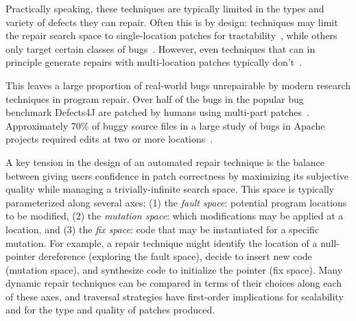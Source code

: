 \documentclass[sigconf, timestamp-false, anonymous=true]{acmart}
\begin{document}
Practically speaking, these techniques are typically limited in the types and
variety of defects they can repair. Often this is by design: techniques may
limit the repair search space to single-location patches for
tractability~\cite{rsrepair,ae,hdrepair}, while others only target certain
classes of bugs~\cite{Xuan17,sapfix,DeMarco14,par}. However, even techniques
that can in principle generate repairs with multi-location patches typically
don't~\cite{patch-correctness}.

This leaves a large proportion of real-world bugs unrepairable by modern
research techniques in program repair.  Over half of the bugs in the popular bug
benchmark Defects4J are patched by humans using multi-part
patches~\cite{d4j-dissection}. Approximately 70\% of buggy source files in a
large study of bugs in Apache projects required edits at two or more
locations~\cite{zhong2015}.

A key tension in the design of an automated repair technique is the balance
between giving users confidence in patch correctness by maximizing its
subjective quality while managing a trivially-infinite search space. This space
is typically parameterized along several axes: (1) the \emph{fault space}:
potential program locations to be modified, (2) the \emph{mutation space}: which
modifications may be applied at a location, and (3) the \emph{fix space}: code
that may be instantiated for a specific mutation. For example, a repair
technique might identify the location of a null-pointer dereference (exploring
the fault space), decide to insert new code (mutation space), and synthesize
code to initialize the pointer (fix space). Many dynamic repair techniques can
be compared in terms of their choices along each of these axes, and traversal
strategies have first-order implications for scalability and for the type and
quality of patches produced.
\end{document}
